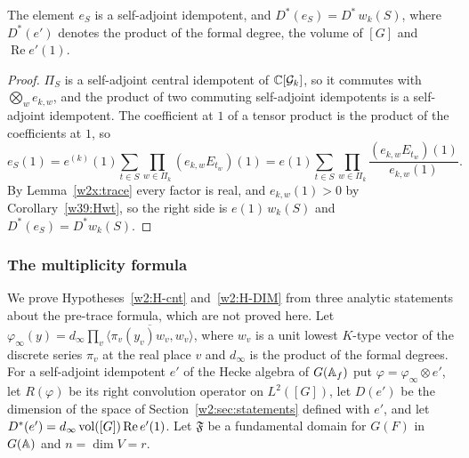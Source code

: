 \begin{lemma}\label{w2x:DS}
The element $e_S$ is a self-adjoint idempotent, and $D^*(e_S)=D^*\,w_k(S)$, where $D^*(e')$ denotes the product of the formal degree, the volume of $[G]$ and $\operatorname{Re}e'(1)$.
\end{lemma}

\begin{proof}
$\Pi_S$ is a self-adjoint central idempotent of $\mathbb C[\mathcal G_k]$, so it commutes with $\bigotimes_we_{k,w}$, and the product of two commuting self-adjoint idempotents is a self-adjoint idempotent. The coefficient at $1$ of a tensor product is the product of the coefficients at $1$, so
\[
e_S(1)=e^{(k)}(1)\sum_{t\in S}\prod_{w\in\Pi_k}(e_{k,w}E_{t_w})(1)=e(1)\sum_{t\in S}\prod_{w\in\Pi_k}\frac{(e_{k,w}E_{t_w})(1)}{e_{k,w}(1)}.
\]
By Lemma~\ref{w2x:trace} every factor is real, and $e_{k,w}(1)>0$ by Corollary~\ref{w39:Hwt}, so the right side is $e(1)\,w_k(S)$ and $D^*(e_S)=D^*w_k(S)$.
\end{proof}

\subsubsection{The multiplicity formula}\label{w2x:sec:count}

We prove Hypotheses~\ref{w2:H-cnt} and~\ref{w2:H-DIM} from three analytic statements about the pre-trace formula, which are not proved here. Let $\varphi_\infty(y)=d_\infty\prod_{v}\overline{\langle\pi_v(y_v)w_v,w_v\rangle}$, where $w_v$ is a unit lowest $K$-type vector of the discrete series $\pi_v$ at the real place $v$ and $d_\infty$ is the product of the formal degrees. For a self-adjoint idempotent $e'$ of the Hecke algebra of $G(\mathbb A_f)$ put $\varphi=\varphi_\infty\otimes e'$, let $R(\varphi)$ be its right convolution operator on $L^2([G])$, let $D(e')$ be the dimension of the space of Section~\ref{w2:sec:statements} defined with $e'$, and let $D^*(e')=d_\infty\operatorname{vol}([G])\operatorname{Re}e'(1)$. Let $\mathfrak F$ be a fundamental domain for $G(F)$ in $G(\mathbb A)$ and $n=\dim V=r$.

